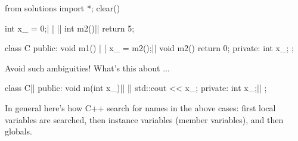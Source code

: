 \begin{python0}
from solutions import *; clear()
\end{python0}

\begin{consolethree}[escapeinside=||]
int x_ = 0;| |
||
int m2()||
{
    return 5;
}

class C
{
public:
    void m1()
    {       | |
        x_ = m2();||
    }
    void m2()
    {
        return 0;
    }
private:
    int x_;
};
\end{consolethree}

Avoid such ambiguities! What's this about ...

\begin{consolethree}[escapeinside=||]
class C||
{
public:
    void m(int x_)||
    {||
        std::cout << x_;
    }
private:
    int x_;||
};
\end{consolethree}
In general here's how C++ search for names in the above
cases: first local variables are searched, then instance variables
(member variables), and then globals.



